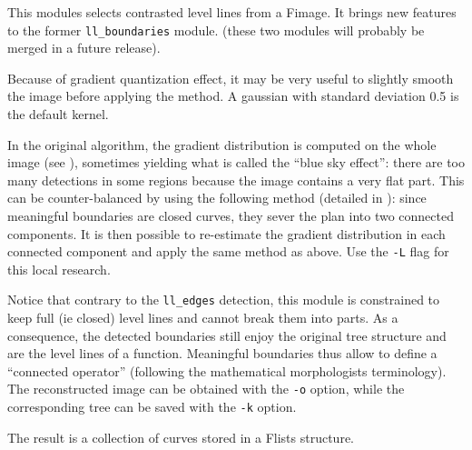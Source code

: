 
This modules selects contrasted level lines from a Fimage.
It brings new features to the former \verb+ll_boundaries+ module.
(these two modules will probably be merged in a future release).

\medskip

Because of gradient quantization effect, it may be very useful to slightly 
smooth the image before applying the method. A gaussian with standard deviation
0.5 is the default kernel. 

\medskip
In the original algorithm, the gradient distribution is computed on the whole 
image (see \cite{desolneux.moisan.ea:edge}), sometimes yielding what is called the ``blue sky effect'':
there are too many detections in some regions because the image contains a very
flat part. This can be counter-balanced by using the following method (detailed
in \cite{cao.muse.sur:shape}): since meaningful boundaries are closed curves, they sever the plan
into two connected components. It is then possible to re-estimate the gradient
distribution in each connected component and apply the same method as
above. Use the \verb+-L+ flag for this local research. 


\medskip
Notice that contrary to the \verb+ll_edges+ detection, this 
module is constrained to keep full (ie closed) level lines and 
cannot break them into parts. As a consequence, the detected boundaries still
enjoy the original tree structure and are the level lines of a function. 
Meaningful boundaries thus allow to define a ``connected operator'' (following
the mathematical morphologists terminology). The reconstructed image can be
obtained with the \verb+-o+ option, while the corresponding tree can be
saved with the \verb+-k+ option. 


\medskip

The result is a collection of curves stored in a Flists structure.


